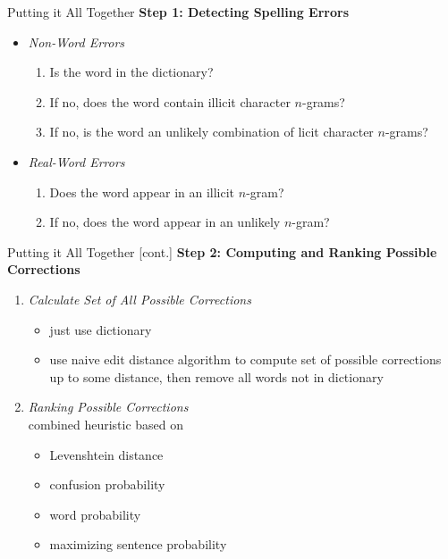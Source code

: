\documentclass[professionalfonts, xcolor={usenames,svgnames,x11names,table}]{beamer}
\begin{document}
\begin{frame}{Putting it All Together}
    \textbf{Step 1: Detecting Spelling Errors}\\
            \begin{itemize}
                \item \emph{Non-Word Errors}\\
                    \begin{enumerate}
                        \item Is the word in the dictionary?
                        \item If no, does the word contain illicit character $n$-grams?
                        \item If no, is the word an unlikely combination of licit character $n$-grams?
                    \end{enumerate}
                \item \emph{Real-Word Errors}\\
                    \begin{enumerate}
                        \item Does the word appear in an illicit $n$-gram?
                        \item If no, does the word appear in an unlikely $n$-gram?
                    \end{enumerate}
            \end{itemize}
\end{frame}

\begin{frame}{Putting it All Together [cont.]}
    \textbf{Step 2: Computing and Ranking Possible Corrections}\\
        \begin{enumerate}
            \item \emph{Calculate Set of All Possible Corrections}
                \begin{itemize}
                    \item just use dictionary
                    \item use naive edit distance algorithm to compute set of possible corrections up to some distance, then remove all words not in dictionary
                \end{itemize}
            \item \emph{Ranking Possible Corrections}\\
                combined heuristic based on
                \begin{itemize}
                    \item Levenshtein distance
                    \item confusion probability
                    \item word probability
                    \item maximizing sentence probability
                \end{itemize}
        \end{enumerate}
\end{frame}
\end{document}
